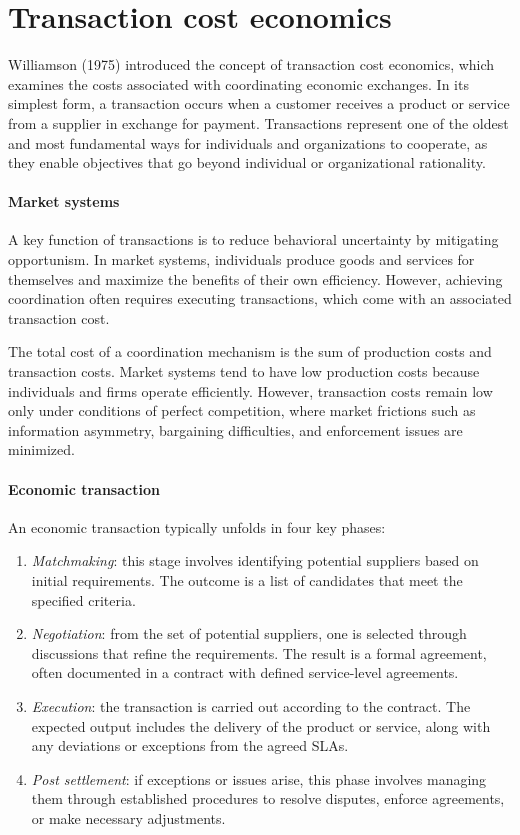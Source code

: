 \section{Transaction cost economics}

Williamson (1975) introduced the concept of transaction cost economics, which examines the costs associated with coordinating economic exchanges. 
In its simplest form, a transaction occurs when a customer receives a product or service from a supplier in exchange for payment. 
Transactions represent one of the oldest and most fundamental ways for individuals and organizations to cooperate, as they enable objectives that go beyond individual or organizational rationality.

\paragraph*{Market systems}
A key function of transactions is to reduce behavioral uncertainty by mitigating opportunism. 
In market systems, individuals produce goods and services for themselves and maximize the benefits of their own efficiency. 
However, achieving coordination often requires executing transactions, which come with an associated transaction cost.

The total cost of a coordination mechanism is the sum of production costs and transaction costs. 
Market systems tend to have low production costs because individuals and firms operate efficiently. 
However, transaction costs remain low only under conditions of perfect competition, where market frictions such as information asymmetry, bargaining difficulties, and enforcement issues are minimized.

\paragraph*{Economic transaction}
An economic transaction typically unfolds in four key phases:
\begin{enumerate}
    \item \textit{Matchmaking}: this stage involves identifying potential suppliers based on initial requirements. 
        The outcome is a list of candidates that meet the specified criteria.
    \item \textit{Negotiation}: from the set of potential suppliers, one is selected through discussions that refine the requirements. 
        The result is a formal agreement, often documented in a contract with defined service-level agreements.
    \item \textit{Execution}: the transaction is carried out according to the contract. 
        The expected output includes the delivery of the product or service, along with any deviations or exceptions from the agreed SLAs.
    \item \textit{Post settlement}: if exceptions or issues arise, this phase involves managing them through established procedures to resolve disputes, enforce agreements, or make necessary adjustments.
\end{enumerate}